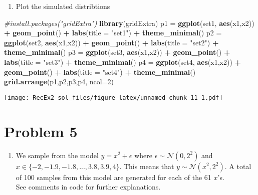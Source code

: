 \documentclass[]{article}
\newenvironment{Shaded}{\begin{snugshade}}{\end{snugshade}}
\newcommand{\CommentTok}[1]{\textcolor[rgb]{0.56,0.35,0.01}{\textit{#1}}}
\newcommand{\DataTypeTok}[1]{\textcolor[rgb]{0.13,0.29,0.53}{#1}}
\newcommand{\DecValTok}[1]{\textcolor[rgb]{0.00,0.00,0.81}{#1}}
\newcommand{\KeywordTok}[1]{\textcolor[rgb]{0.13,0.29,0.53}{\textbf{#1}}}
\newcommand{\NormalTok}[1]{#1}
\newcommand{\OperatorTok}[1]{\textcolor[rgb]{0.81,0.36,0.00}{\textbf{#1}}}
\newcommand{\StringTok}[1]{\textcolor[rgb]{0.31,0.60,0.02}{#1}}
\providecommand{\tightlist}{%
  \setlength{\itemsep}{0pt}\setlength{\parskip}{0pt}}
\begin{document}
\begin{enumerate}
\def\labelenumi{\alph{enumi})}
\setcounter{enumi}{1}
\tightlist
\item
  Plot the simulated distribtions
\end{enumerate}

\begin{Shaded}
\begin{Highlighting}[]
\CommentTok{#install.packages("gridExtra")}
\KeywordTok{library}\NormalTok{(gridExtra)}
\NormalTok{p1 =}\StringTok{ }\KeywordTok{ggplot}\NormalTok{(set1, }\KeywordTok{aes}\NormalTok{(x1,x2)) }\OperatorTok{+}\StringTok{ }\KeywordTok{geom_point}\NormalTok{() }\OperatorTok{+}\StringTok{ }\KeywordTok{labs}\NormalTok{(}\DataTypeTok{title =} \StringTok{"set1"}\NormalTok{) }\OperatorTok{+}\StringTok{ }\KeywordTok{theme_minimal}\NormalTok{()}
\NormalTok{p2 =}\StringTok{ }\KeywordTok{ggplot}\NormalTok{(set2, }\KeywordTok{aes}\NormalTok{(x1,x2)) }\OperatorTok{+}\StringTok{ }\KeywordTok{geom_point}\NormalTok{() }\OperatorTok{+}\StringTok{ }\KeywordTok{labs}\NormalTok{(}\DataTypeTok{title =} \StringTok{"set2"}\NormalTok{) }\OperatorTok{+}\StringTok{ }\KeywordTok{theme_minimal}\NormalTok{()}
\NormalTok{p3 =}\StringTok{ }\KeywordTok{ggplot}\NormalTok{(set3, }\KeywordTok{aes}\NormalTok{(x1,x2)) }\OperatorTok{+}\StringTok{ }\KeywordTok{geom_point}\NormalTok{() }\OperatorTok{+}\StringTok{ }\KeywordTok{labs}\NormalTok{(}\DataTypeTok{title =} \StringTok{"set3"}\NormalTok{) }\OperatorTok{+}\StringTok{ }\KeywordTok{theme_minimal}\NormalTok{()}
\NormalTok{p4 =}\StringTok{ }\KeywordTok{ggplot}\NormalTok{(set4, }\KeywordTok{aes}\NormalTok{(x1,x2)) }\OperatorTok{+}\StringTok{ }\KeywordTok{geom_point}\NormalTok{() }\OperatorTok{+}\StringTok{ }\KeywordTok{labs}\NormalTok{(}\DataTypeTok{title =} \StringTok{"set4"}\NormalTok{) }\OperatorTok{+}\StringTok{ }\KeywordTok{theme_minimal}\NormalTok{()}
\KeywordTok{grid.arrange}\NormalTok{(p1,p2,p3,p4, }\DataTypeTok{ncol=}\DecValTok{2}\NormalTok{)}
\end{Highlighting}
\end{Shaded}

\texttt{[image: RecEx2-sol\_files/figure-latex/unnamed-chunk-11-1.pdf]}

\hypertarget{problem-5}{%
\section{Problem 5}\label{problem-5}}

\begin{enumerate}
\def\labelenumi{\alph{enumi})}
\tightlist
\item
  We sample from the model \(y=x^2+\epsilon\) where
  \(\epsilon \sim \mathcal{N}(0,2^2)\) and
  \(x\in \{-2,-1.9,-1.8,...,3.8,3.9,4\}\). This means that
  \(y \sim \mathcal{N}(x^2,2^2)\). A total of 100 samples from this
  model are generated for each of the 61 \(x\)'s.\\
  See comments in code for further explanations.
\end{enumerate}
\end{document}
